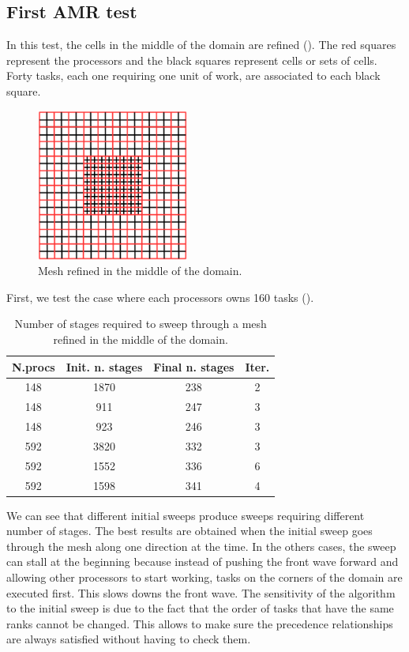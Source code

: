 \documentclass[letterpaper]{article}
\renewcommand{\(}{\left(}
\renewcommand{\)}{\right)}
\renewcommand{\[}{\left[}
\renewcommand{\]}{\right]}
\begin{document}
\subsection{First AMR test}
In this test, the cells in the middle of the domain are refined ().
The red squares represent the processors and the black squares represent cells
or sets of cells. Forty tasks, each one requiring one unit of work, are
associated to each black square.
\begin{figure}[H]
  \centering
  \includegraphics[width=5cm]{mesh}
  \caption{Mesh refined in the middle of the domain.}
  \label{mesh_1}
\end{figure}
First, we test the case where each processors owns 160 tasks ().
\begin{table}[H]
  \begin{center}
    \begin{tabular}{|c|c|c|c|}
      \hline
      N.procs & Init. n. stages & Final n. stages & Iter. \\
      \hline
      148 & 1870 & 238 & 2 \\
      148 &  911 & 247 & 3 \\
      148 &  923 & 246 & 3 \\
      592 & 3820 & 332 & 3 \\
      592 & 1552 & 336 & 6 \\
      592 & 1598 & 341 & 4 \\
      \hline
    \end{tabular}
    \caption{Number of stages required to sweep through a mesh refined
    in the middle of the domain.}
    \label{amr_1}
  \end{center}
\end{table}
We can see that different initial sweeps produce sweeps requiring different
number of stages. The best results are obtained when the initial sweep goes
through the mesh along one direction at the time. In the others cases, the sweep
can stall at the beginning because instead of pushing the front wave forward and
allowing other processors to start working, tasks on the corners of the domain
are executed first. This slows downs the front wave. The sensitivity of the
algorithm to the initial sweep is due to the fact that the order of tasks that
have the same ranks cannot be changed. This allows to make sure the precedence
relationships are always satisfied without having to check them. 
\end{document}
